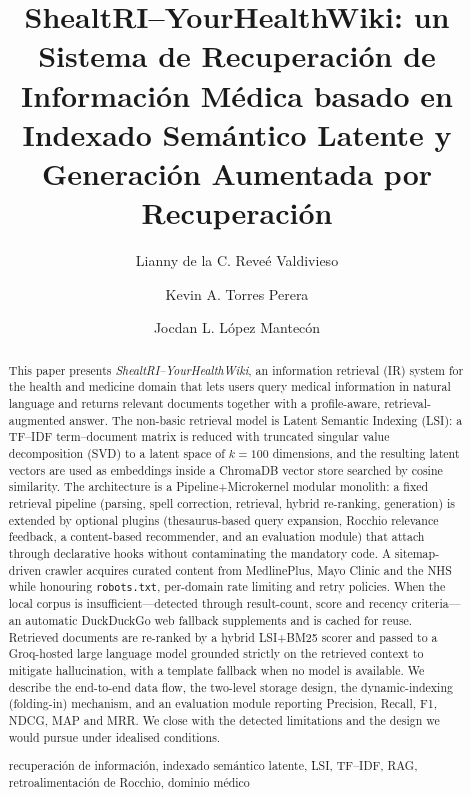 \documentclass[runningheads,a4paper,14pts]{llncs}
\newcommand{\keywords}[1]{\par\addvspace\baselineskip
	\noindent\keywordname\enspace\ignorespaces#1}
\begin{document}
	
	\mainmatter
	
	\title{ShealtRI--YourHealthWiki: un Sistema de Recuperación de Información Médica basado en Indexado Semántico Latente y Generación Aumentada por Recuperación}
	
	
	\author{Lianny de la C. Reveé Valdivieso \and Kevin A. Torres Perera \and Jocdan L. López Mantecón}
	
	
	
	\maketitle
	
	\begin{abstract}
		This paper presents \emph{ShealtRI--YourHealthWiki}, an information retrieval (IR)
		system for the health and medicine domain that lets users query medical
		information in natural language and returns relevant documents together with a
		profile-aware, retrieval-augmented answer. The non-basic retrieval model is
		Latent Semantic Indexing (LSI): a TF--IDF term--document matrix is reduced with
		truncated singular value decomposition (SVD) to a latent space of $k=100$
		dimensions, and the resulting latent vectors are used as embeddings inside a
		ChromaDB vector store searched by cosine similarity. The architecture is a
		Pipeline+Microkernel modular monolith: a fixed retrieval pipeline (parsing,
		spell correction, retrieval, hybrid re-ranking, generation) is extended by
		optional plugins (thesaurus-based query expansion, Rocchio relevance feedback,
		a content-based recommender, and an evaluation module) that attach through
		declarative hooks without contaminating the mandatory code. A sitemap-driven
		crawler acquires curated content from MedlinePlus, Mayo Clinic and the NHS while
		honouring \texttt{robots.txt}, per-domain rate limiting and retry policies. When
		the local corpus is insufficient---detected through result-count, score and
		recency criteria---an automatic DuckDuckGo web fallback supplements and is cached
		for reuse. Retrieved documents are re-ranked by a hybrid LSI+BM25 scorer and
		passed to a Groq-hosted large language model grounded strictly on the retrieved
		context to mitigate hallucination, with a template fallback when no model is
		available. We describe the end-to-end data flow, the two-level storage design,
		the dynamic-indexing (folding-in) mechanism, and an evaluation module reporting
		Precision, Recall, F1, NDCG, MAP and MRR. We close with the detected limitations
		and the design we would pursue under idealised conditions.
		\keywords{recuperación de información, indexado semántico latente, LSI, TF--IDF,
			RAG, retroalimentación de Rocchio, dominio médico}
	\end{abstract}
	
\end{document}
